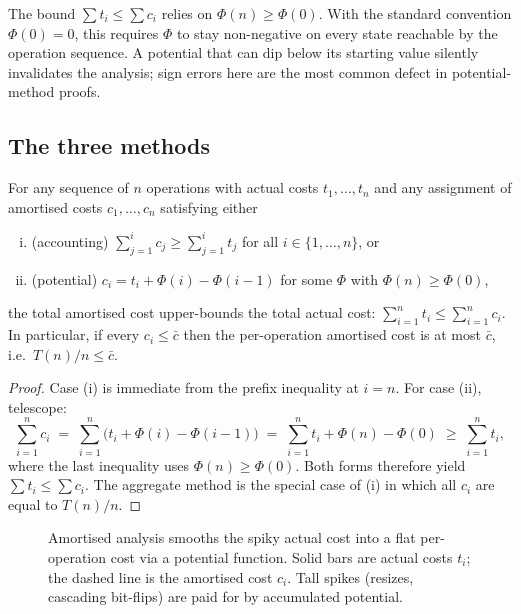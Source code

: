 \begin{remark}
The bound $\sum t_i \le \sum c_i$ relies on $\Phi(n) \ge \Phi(0)$. With the standard convention $\Phi(0) = 0$, this requires $\Phi$ to stay non-negative on every state reachable by the operation sequence. A potential that can dip below its starting value silently invalidates the analysis; sign errors here are the most common defect in potential-method proofs.
\end{remark}

\subsection{The three methods}

\begin{theorem}
\label{thm:amortised_definition}
For any sequence of $n$ operations with actual costs $t_1, \dots, t_n$ and any assignment of amortised costs $c_1, \dots, c_n$ satisfying either
\begin{enumerate}[(i)]
  \item (accounting) $\sum_{j=1}^{i} c_j \ge \sum_{j=1}^{i} t_j$ for all $i \in \{1, \dots, n\}$, or
  \item (potential) $c_i = t_i + \Phi(i) - \Phi(i-1)$ for some $\Phi$ with $\Phi(n) \ge \Phi(0)$,
\end{enumerate}
the total amortised cost upper-bounds the total actual cost: $\sum_{i=1}^{n} t_i \le \sum_{i=1}^{n} c_i$. In particular, if every $c_i \le \bar c$ then the per-operation amortised cost is at most $\bar c$, i.e.\ $T(n)/n \le \bar c$.
\end{theorem}

\begin{proof}
Case (i) is immediate from the prefix inequality at $i = n$. For case (ii), telescope:
\[
  \sum_{i=1}^{n} c_i \;=\; \sum_{i=1}^{n}\bigl(t_i + \Phi(i) - \Phi(i-1)\bigr)
  \;=\; \sum_{i=1}^{n} t_i + \Phi(n) - \Phi(0)
  \;\ge\; \sum_{i=1}^{n} t_i,
\]
where the last inequality uses $\Phi(n) \ge \Phi(0)$. Both forms therefore yield $\sum t_i \le \sum c_i$. The aggregate method is the special case of (i) in which all $c_i$ are equal to $T(n)/n$.
\end{proof}

\begin{figure}[h]
  \centering
  
  \caption{Amortised analysis smooths the spiky actual cost into a flat per-operation cost via a potential function. Solid bars are actual costs $t_i$; the dashed line is the amortised cost $c_i$. Tall spikes (resizes, cascading bit-flips) are paid for by accumulated potential.}
  \label{fig:potential}
\end{figure}

